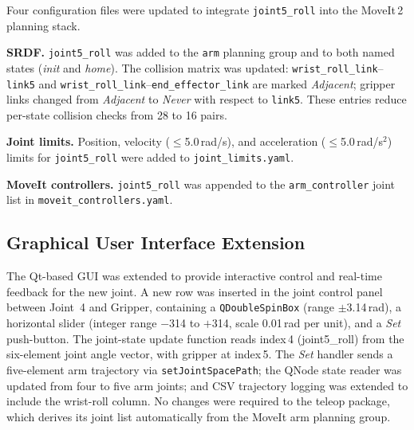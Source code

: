 \documentclass[conference]{IEEEtran}
\begin{document}
		Four configuration files were updated to integrate
		\texttt{joint5\_roll} into the MoveIt\,2 planning stack.
		
		\textbf{SRDF.}
		\texttt{joint5\_roll} was added to the \texttt{arm} planning group
		and to both named states (\textit{init} and \textit{home}). The
		collision matrix was updated: \texttt{wrist\_roll\_link}--\texttt{link5}
		and \texttt{wrist\_roll\_link}--\texttt{end\_effector\_link} are
		marked \textit{Adjacent}; gripper links changed from \textit{Adjacent}
		to \textit{Never} with respect to \texttt{link5}. These entries reduce
		per-state collision checks from 28 to 16 pairs.
		
		\textbf{Joint limits.}
		Position, velocity ($\leq$5.0\,rad/s), and acceleration
		($\leq$5.0\,rad/s$^2$) limits for \texttt{joint5\_roll} were added
		to \texttt{joint\_limits.yaml}.
		
		
		\textbf{MoveIt controllers.}
		\texttt{joint5\_roll} was appended to the \texttt{arm\_controller}
		joint list in \texttt{moveit\_controllers.yaml}.
		
		\subsection{Graphical User Interface Extension}
		
		The Qt-based GUI was extended to provide interactive control and
		real-time feedback for the new joint. A new row was inserted in the
		joint control panel between Joint~4 and Gripper, containing a
		\texttt{QDoubleSpinBox} (range $\pm$3.14\,rad), a horizontal slider
		(integer range $-$314 to $+$314, scale 0.01\,rad per unit), and a
		\textit{Set} push-button. The joint-state update function reads
		index\,4 (joint5\_roll) from the six-element joint angle vector, with
		gripper at index\,5. The \textit{Set} handler sends a five-element arm
		trajectory via \texttt{setJointSpacePath}; the QNode state reader was
		updated from four to five arm joints; and CSV trajectory logging was
		extended to include the wrist-roll column. No changes were required
		to the teleop package, which derives its joint list automatically
		from the MoveIt arm planning group.
		
\end{document}
